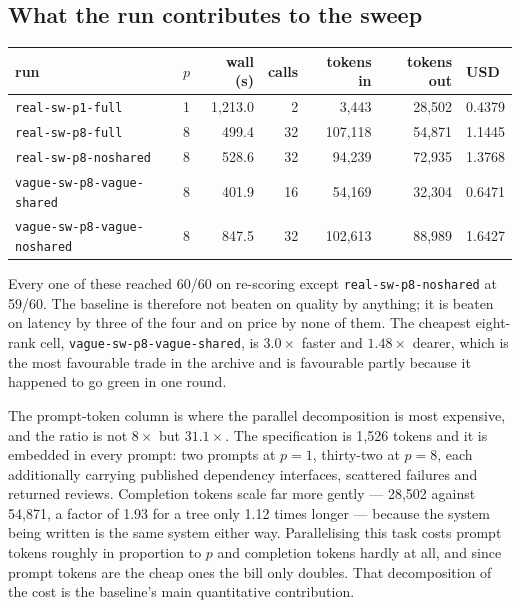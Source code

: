 \documentclass[11pt]{article}
\begin{document}
\subsection*{What the run contributes to the sweep}

\begin{center}
\begin{tabular}{@{}lrrrrrl@{}}
\toprule
run & $p$ & wall (s) & calls & tokens in & tokens out & USD \\
\midrule
\texttt{real-sw-p1-full} & 1 & 1{,}213.0 & 2 & 3{,}443 & 28{,}502 & 0.4379 \\
\texttt{real-sw-p8-full} & 8 & 499.4 & 32 & 107{,}118 & 54{,}871 & 1.1445 \\
\texttt{real-sw-p8-noshared} & 8 & 528.6 & 32 & 94{,}239 & 72{,}935 & 1.3768 \\
\texttt{vague-sw-p8-vague-shared} & 8 & 401.9 & 16 & 54{,}169 & 32{,}304 & 0.6471 \\
\texttt{vague-sw-p8-vague-noshared} & 8 & 847.5 & 32 & 102{,}613 & 88{,}989 & 1.6427 \\
\bottomrule
\end{tabular}
\end{center}

Every one of these reached 60/60 on re-scoring except \texttt{real-sw-p8-noshared} at 59/60.
The baseline is therefore not beaten on quality by anything; it is beaten on latency by three
of the four and on price by none of them. The cheapest eight-rank cell,
\texttt{vague-sw-p8-vague-shared}, is $3.0\times$ faster and $1.48\times$ dearer, which is the
most favourable trade in the archive and is favourable partly because it happened to go green
in one round.

The prompt-token column is where the parallel decomposition is most expensive, and the ratio
is not $8\times$ but $31.1\times$. The specification is 1{,}526 tokens and it is embedded in
every prompt: two prompts at $p=1$, thirty-two at $p=8$, each additionally carrying published
dependency interfaces, scattered failures and returned reviews. Completion tokens scale far
more gently --- 28{,}502 against 54{,}871, a factor of 1.93 for a tree only 1.12 times longer
--- because the system being written is the same system either way. Parallelising this task
costs prompt tokens roughly in proportion to $p$ and completion tokens hardly at all, and
since prompt tokens are the cheap ones the bill only doubles. That decomposition of the cost
is the baseline's main quantitative contribution.
\end{document}

